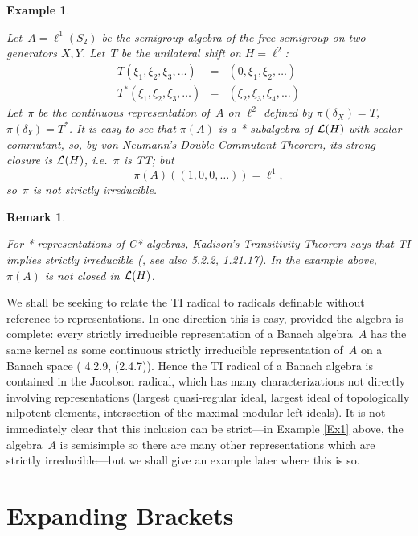 \documentclass[11pt]{article}
\newcommand{\ie}{i.e.\ }
\newtheorem{example}[thm]{Example}
\newtheorem{remk}[thm]{Remark}
\newenvironment{Example}{\begin{example}\begin{rm}}{\end{rm}\end{example}}
\newenvironment{Remark}{\begin{remk}\begin{rm}}{\end{rm}\end{remk}}
\newcommand{\LH}{{\cal L}(H)}
\begin{document}
\begin{Example}\label{Ex1}
Let~$A= \ell^1(S_2)$ be the semigroup algebra of the free semigroup on two
generators $X,Y$.    Let~$T$ be the unilateral shift on $H=\ell^2$:
\begin{eqnarray*}
T(\xi_1,\xi_2,\xi_3,\dots) & = & (0,\xi_1,\xi_2,\dots)\\
T^*(\xi_1,\xi_2,\xi_3,\dots) & = & (\xi_2,\xi_3,\xi_4,\dots)
\end{eqnarray*}
Let~$\pi$ be the continuous representation of~$A$ on $\ell^2$ defined by
$\pi(\delta_X) = T$, $\pi(\delta_Y) = T^*$.   It is easy to see that
$\pi(A)$ is a *-subalgebra of $\LH$ with scalar commutant, so, by von Neumann's
Double Commutant Theorem, its strong closure is $\LH$, \ie $\pi$ is TT; but
$$\pi(A)((1,0,0,\dots))  = \ell^1,$$ so~$\pi$ is not strictly irreducible.
\end{Example}

\begin{Remark}
For *-representations of C*-algebras,
Kadison's Transitivity Theorem says that TI implies strictly irreducible
(\cite{Kadison}, see also \cite{Murphy} 5.2.2, \cite{Sakai} 1.21.17).  In
the example above, $\pi(A)$ is not closed in $\LH$.
\end{Remark}

We shall be seeking to relate the TI radical to radicals definable without
reference to representations.    In one direction this is easy, provided the
algebra is complete:  every strictly irreducible representation of a Banach algebra~$A$ has the
same kernel as some continuous strictly irreducible representation of~$A$ on a Banach
space (\cite{Palmerbk} 4.2.9, \cite{Rickart} (2.4.7)).    Hence the TI radical
of a Banach algebra is contained in the Jacobson radical, which has many
characterizations not directly involving representations (largest quasi-regular
ideal, largest ideal of topologically nilpotent elements, intersection of the
maximal modular left ideals).   It is not immediately clear
that this inclusion can be strict---in Example \ref{Ex1} above, the algebra~$A$
is semisimple so there are many other representations which are strictly
irreducible---but we shall give an example later where this is so.



\section{Expanding  Brackets}\label{S4}
\end{document}
